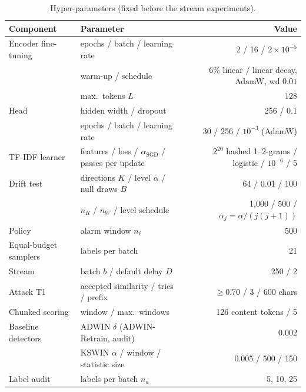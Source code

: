 \begin{table}[t]
\centering
\caption{Hyper-parameters (fixed before the stream experiments).}
\label{tab:hyper}
\scriptsize
\begin{tabular}{@{}llr@{}}
\toprule
Component & Parameter & Value \\
\midrule
Encoder fine-tuning & epochs / batch / learning rate & 2 / 16 / $2\times10^{-5}$ \\
 & warm-up / schedule & 6\% linear / linear decay, AdamW, wd $0.01$ \\
 & max.\ tokens $L$ & 128 \\
Head & hidden width / dropout & 256 / 0.1 \\
 & epochs / batch / learning rate & 30 / 256 / $10^{-3}$ (AdamW) \\
TF-IDF learner & features / loss / $\alpha_{\mathrm{SGD}}$ / passes per update & $2^{20}$ hashed 1--2-grams / logistic / $10^{-6}$ / 5 \\
Drift test & directions $K$ / level $\alpha$ / null draws $B$ & 64 / 0.01 / 100 \\
 & $n_R$ / $n_W$ / level schedule & 1{,}000 / 500 / $\alpha_j=\alpha/(j(j+1))$ \\
Policy & alarm window $n_\ell$ & 500 \\
Equal-budget samplers & labels per batch & 21 \\
Stream & batch $b$ / default delay $D$ & 250 / 2 \\
Attack T1 & accepted similarity / tries / prefix & $\ge 0.70$ / 3 / 600 chars \\
Chunked scoring & window / max.\ windows & 126 content tokens / 5 \\
Baseline detectors & ADWIN $\delta$ (ADWIN-Retrain, audit) & 0.002 \\
 & KSWIN $\alpha$ / window / statistic size & 0.005 / 500 / 150 \\
Label audit & labels per batch $n_a$ & 5, 10, 25 \\
\bottomrule
\end{tabular}
\end{table}
